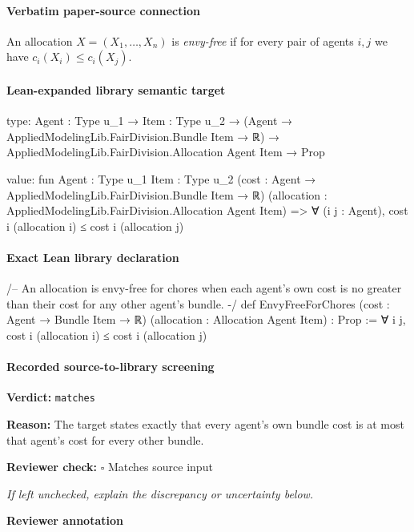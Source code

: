 \documentclass[10pt]{article}
\newcommand{\reviewerbox}{%
  \par\noindent\fbox{\parbox{0.96\linewidth}{\rule{0pt}{0.38in}}}\par
}
\newcommand{\reviewmatch}[1]{%
  \par\noindent\textbf{Reviewer check:} $\square$\; #1\par
  \noindent\emph{If left unchecked, explain the discrepancy or uncertainty below.}\par
}
\begin{document}
\paragraph{Verbatim paper-source connection}
\begin{ReviewVerbatim}
\begin{definition}
An allocation $X=(X_1,\ldots,X_n)$ is \emph{envy-free} if for every pair of agents $i,j$ we have $c_i(X_i)\leq c_i(X_j)$.
\end{definition}
\end{ReviewVerbatim}



\paragraph{Lean-expanded library semantic target}
\begin{ReviewVerbatim}
type:
{Agent : Type u_1} →
  {Item : Type u_2} →
    (Agent → AppliedModelingLib.FairDivision.Bundle Item → ℝ) →
      AppliedModelingLib.FairDivision.Allocation Agent Item → Prop

value:
fun {Agent : Type u_1} {Item : Type u_2} (cost : Agent → AppliedModelingLib.FairDivision.Bundle Item → ℝ)
    (allocation : AppliedModelingLib.FairDivision.Allocation Agent Item) =>
  ∀ (i j : Agent), cost i (allocation i) ≤ cost i (allocation j)
\end{ReviewVerbatim}

\paragraph{Exact Lean library declaration}
\begin{ReviewVerbatim}
/-- An allocation is envy-free for chores when each agent's own cost is no
greater than their cost for any other agent's bundle. -/
def EnvyFreeForChores (cost : Agent → Bundle Item → ℝ)
    (allocation : Allocation Agent Item) : Prop :=
  ∀ i j, cost i (allocation i) ≤ cost i (allocation j)
\end{ReviewVerbatim}

\paragraph{Recorded source-to-library screening}
\textbf{Verdict:} \texttt{matches}
\\
{\raggedright
\textbf{Reason:} The target states exactly that every agent's own bundle cost is at most that agent's cost for every other bundle.\allowbreak{}
\par}
\reviewmatch{Matches source input}
\noindent\textbf{Reviewer annotation}\par
\reviewerbox
\clearpage
\hypertarget{library-prerequisite-95d7f6c33ea68817}{}
\end{document}

